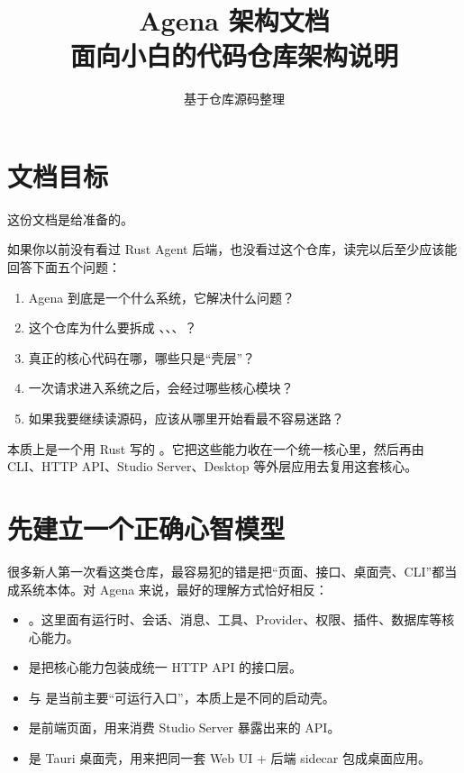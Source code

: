 \documentclass[11pt,a4paper]{ctexart}
\title{\textbf{Agena 架构文档}\\\large 面向小白的代码仓库架构说明}
\author{基于仓库源码整理}
\date{\docversion}
\begin{document}
\maketitle
\tableofcontents
\clearpage

\section{文档目标}

这份文档是给准备的。

如果你以前没有看过 Rust Agent 后端，也没看过这个仓库，读完以后至少应该能回答下面五个问题：

\begin{enumerate}
  \item Agena 到底是一个什么系统，它解决什么问题？
  \item 这个仓库为什么要拆成 、、、？
  \item 真正的核心代码在哪，哪些只是“壳层”？
  \item 一次请求进入系统之后，会经过哪些核心模块？
  \item 如果我要继续读源码，应该从哪里开始看最不容易迷路？
\end{enumerate}

\begin{summarybox}[一句话先记住]
 本质上是一个用 Rust 写的 。它把这些能力收在一个统一核心里，然后再由 CLI、HTTP API、Studio Server、Desktop 等外层应用去复用这套核心。
\end{summarybox}

\section{先建立一个正确心智模型}

很多新人第一次看这类仓库，最容易犯的错是把“页面、接口、桌面壳、CLI”都当成系统本体。对 Agena 来说，最好的理解方式恰好相反：

\begin{itemize}
  \item {}。这里面有运行时、会话、消息、工具、Provider、权限、插件、数据库等核心能力。
  \item {} 是把核心能力包装成统一 HTTP API 的接口层。
  \item {} 与  是当前主要“可运行入口”，本质上是不同的启动壳。
  \item {} 是前端页面，用来消费 Studio Server 暴露出来的 API。
  \item {} 是 Tauri 桌面壳，用来把同一套 Web UI + 后端 sidecar 包成桌面应用。
\end{itemize}
\end{document}
